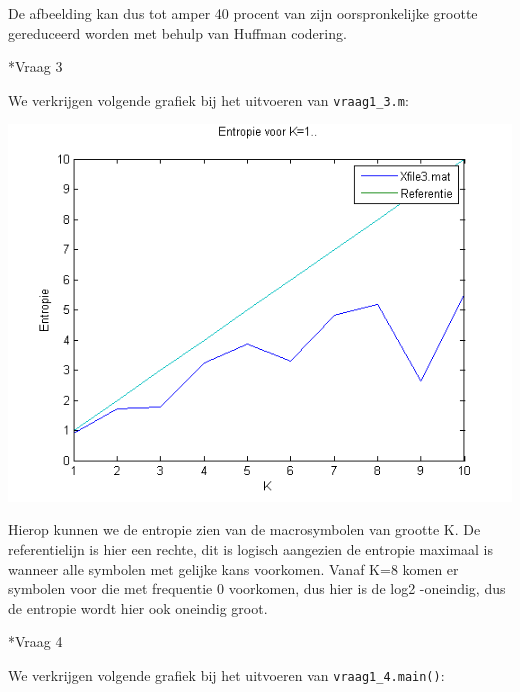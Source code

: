 \documentclass[]{article}
\begin{document}
\begin{section}
\begin{subsection}
        De afbeelding kan dus tot amper 40 procent van zijn
        oorspronkelijke grootte gereduceerd worden met behulp van
        Huffman codering.

    \end{subsection}

    \begin{subsection}*{Vraag 3}

        We verkrijgen volgende grafiek bij het uitvoeren van
        \texttt{vraag1\_3.m}:

        \includegraphics{vraag1_3.png}

        Hierop kunnen we de entropie zien van de macrosymbolen van
        grootte K. De referentielijn is hier een rechte, dit is logisch
        aangezien de entropie maximaal is wanneer alle symbolen met
        gelijke kans voorkomen.
        Vanaf K=8 komen er symbolen voor die met frequentie 0
        voorkomen, dus hier is de log2 -oneindig, dus de entropie wordt
        hier ook oneindig groot.

    \end{subsection}

    \begin{subsection}*{Vraag 4}

        We verkrijgen volgende grafiek bij het uitvoeren van
        \texttt{vraag1\_4.main()}:


\end{subsection}
\end{section}
\end{document}
